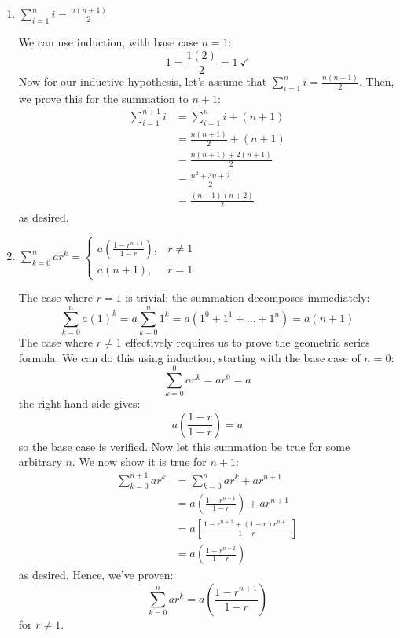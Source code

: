 \documentclass[11pt]{article}
\begin{document}
\begin{enumerate}[(a)]
\begin{enumerate}
        \item $\sum_{i=1}^n i = \frac{n(n+1)}{2}$ 

			\begin{solution}
				We can use induction, with base case $n = 1$:
				\[
				1 = \frac{1(2)}{2} = 1 \ \checkmark
				\] 
				Now for our inductive hypothesis, let's assume that $\sum_{i = 1}^n i = \frac{n (n+1)}{2}$. 
				Then, we prove this for the summation to $n+1$: 
				\begin{align*}
					\sum_{i = 1}^{n+1} i &= \sum_{i = 1}^n i + (n+1) \\
					&= \frac{n(n+1)}{2} + (n+1)	\\
					&= \frac{n(n+1) + 2(n+1)}{2} \\
					&= \frac{n^2 + 3n + 2}{2} \\
					&= \frac{(n+1)(n+2)}{2} 
				\end{align*} 
				as desired.
			\end{solution}

        \item $\sum_{k=0}^n ar^k = \begin{cases}
        a\left(\frac{1 - r^{n+1}}{1 - r}\right), & r \neq 1 \\
        a(n+1), & r=1
        \end{cases}$

		\begin{solution}
			The case where $r =1$ is trivial: the summation decomposes immediately:
			\[
				\sum_{k = 0}^n a(1)^k = a \sum_{k = 0}^n 1^k = a(1^{0} + 1^{1} + \dots + 1^n) = a(n+1)
			\] 
			The case where $r \neq 1$ effectively requires us to prove the geometric series formula. We 
			can do this using induction, starting with the base case of $n = 0$:
			\[
				\sum_{k = 0}^0 ar^k = ar^0 = a
			\] 
			the right hand side gives:
			\[
				a\left( \frac{1 - r}{1-r} \right) = a
			\] 
			so the base case is verified. Now let this summation be true for some arbitrary $n$. We now show 
			it is true for $n+1$:
			\begin{align*}
				\sum_{k =0}^{n+1} ar^k &= \sum_{k = 0}^n ar^k + ar^{n+1} \\
				&= a\left( \frac{1 - r^{n+1}}{1-r} \right)  + ar^{n+1}\\
				&= a\left[\frac{1 - r^{n+1} + (1-r)r^{n+1}}{1-r}\right] \\
				&= a\left( \frac{1 - r^{n + 2}}{1-r} \right)  
			\end{align*} 
			as desired. Hence, we've proven:
			\[
				\sum_{k = 0}^n ar^k = a\left( \frac{1 - r^{n+1}}{1-r} \right) 
			\] 
			for $r \neq 1$. 
		\end{solution}
    \end{enumerate} 

\end{enumerate}
\pagebreak
{}
\end{document}
